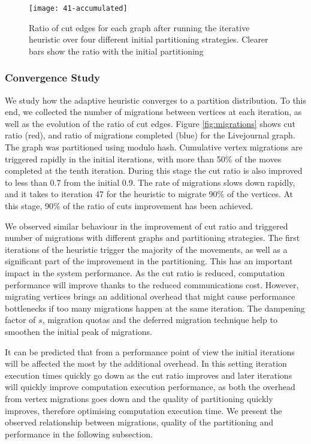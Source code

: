\documentclass{sig-alternate-10pt}
\begin{document}
\begin{figure}
  \centering
    \texttt{[image: 41-accumulated]}
       \vspace{-10pt}
  \caption{ Ratio of cut edges for each graph after running the iterative heuristic over four different initial partitioning strategies. Clearer bars show the ratio with the initial partitioning}
         \vspace{-10pt}
  \label{fig:41-accumulated}
\end{figure}

\subsubsection{Convergence Study}

We study how the adaptive heuristic converges to a partition distribution. To this end, we collected the number of migrations between vertices at each iteration, as well as the evolution of the ratio of cut edges. Figure \ref{fig:migrations} shows cut ratio (red), and ratio of migrations completed (blue) for the Livejournal graph. The graph was partitioned using modulo hash. Cumulative vertex migrations are triggered rapidly in the initial iterations, with more than 50\% of the moves completed at the tenth iteration. During this stage the cut ratio is also improved to less than 0.7 from the initial 0.9. The rate of migrations slows down rapidly, and it takes to iteration 47 for the heuristic to migrate 90\% of the vertices. At this stage, 90\% of the ratio of cuts improvement has been achieved. 

We observed similar behaviour in the improvement of cut ratio and triggered number of migrations with different graphs and partitioning strategies. The first iterations of the heuristic trigger the majority of the movements, as well as a significant part of the improvement in the partitioning. This has an important impact in the system performance. As the cut ratio is reduced, computation performance will improve thanks to the reduced communications cost. However, migrating vertices brings an additional overhead that might cause performance bottlenecks if too many migrations happen at the same iteration. The dampening factor of $s$, migration quotas and the deferred migration technique help to smoothen the initial peak of migrations. 

It can be predicted that from a performance point of view the initial iterations will be affected the most by the additional overhead. In this setting iteration execution times quickly go down as the cut ratio improves and later iterations will quickly improve computation execution performance, as both the overhead from vertex migrations goes down and the quality of partitioning quickly improves, therefore optimising computation execution time. We present the observed relationship between migrations, quality of the partitioning and performance in the following subsection.
\end{document}
